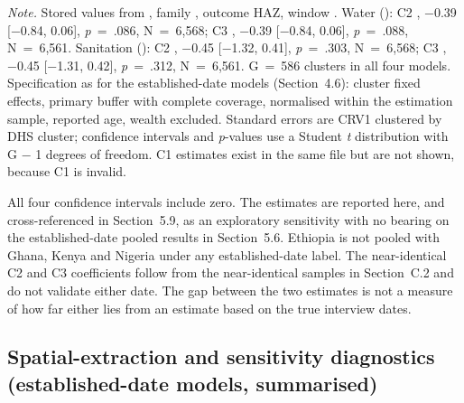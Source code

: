 \begin{ThesisTableNote}

\raggedright

\emph{Note.} Stored values from , family , outcome HAZ, window . Water (): C2 , −0.39 {[}−0.84, 0.06{]}, \emph{p}~=~.086, N~=~6,568; C3 , −0.39 {[}−0.84, 0.06{]}, \emph{p}~=~.088, N~=~6,561. Sanitation (): C2 , −0.45 {[}−1.32, 0.41{]}, \emph{p}~=~.303, N~=~6,568; C3 , −0.45 {[}−1.31, 0.42{]}, \emph{p}~=~.312, N~=~6,561. G~=~586 clusters in all four models. Specification as for the established-date models (Section~4.6): cluster fixed effects, primary buffer with complete coverage,  normalised within the estimation sample, reported age, wealth excluded. Standard errors are CRV1 clustered by DHS cluster; confidence intervals and \emph{p}-values use a Student \emph{t} distribution with G − 1 degrees of freedom. C1 estimates exist in the same file but are not shown, because C1 is invalid.

\end{ThesisTableNote}

All four confidence intervals include zero. The estimates are reported here, and cross-referenced in Section~5.9, as an exploratory sensitivity with no bearing on the established-date pooled results in Section~5.6. Ethiopia is not pooled with Ghana, Kenya and Nigeria under any established-date label. The near-identical C2 and C3 coefficients follow from the near-identical samples in Section~C.2 and do not validate either date. The gap between the two estimates is not a measure of how far either lies from an estimate based on the true interview dates.

\subsection{Spatial-extraction and sensitivity diagnostics (established-date models, summarised)}\label{sec:C.4}

